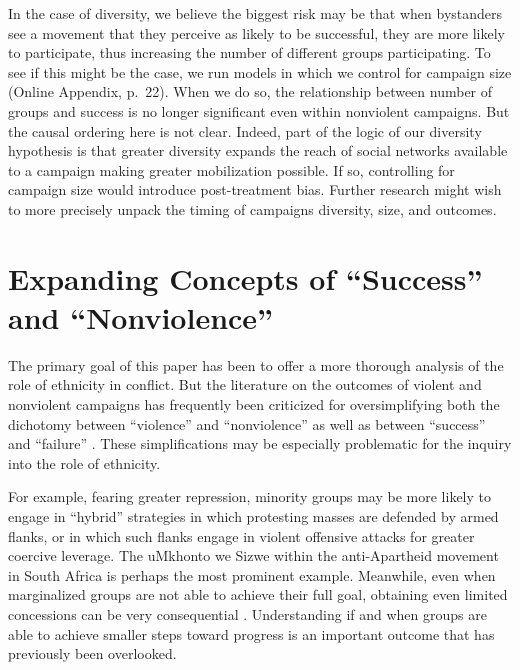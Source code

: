 \documentclass[
  letterpaper,
  DIV=11,
  numbers=noendperiod]{scrartcl}
\begin{document}
In the case of diversity, we believe the biggest risk may be that when
bystanders see a movement that they perceive as likely to be successful,
they are more likely to participate, thus increasing the number of
different groups participating. To see if this might be the case, we run
models in which we control for campaign size (Online Appendix, p.~22).
When we do so, the relationship between number of groups and success is
no longer significant even within nonviolent campaigns. But the causal
ordering here is not clear. Indeed, part of the logic of our diversity
hypothesis is that greater diversity expands the reach of social
networks available to a campaign making greater mobilization possible.
If so, controlling for campaign size would introduce post-treatment
bias. Further research might wish to more precisely unpack the timing of
campaigns diversity, size, and outcomes.

\section{Expanding Concepts of ``Success'' and
``Nonviolence''}\label{expanding-concepts-of-success-and-nonviolence}

The primary goal of this paper has been to offer a more thorough
analysis of the role of ethnicity in conflict. But the literature on the
outcomes of violent and nonviolent campaigns has frequently been
criticized for oversimplifying both the dichotomy between ``violence''
and ``nonviolence'' as well as between ``success'' and ``failure''
\autocite{Turner2023}. These simplifications may be especially
problematic for the inquiry into the role of ethnicity.

For example, fearing greater repression, minority groups may be more
likely to engage in ``hybrid'' strategies in which protesting masses are
defended by armed flanks, or in which such flanks engage in violent
offensive attacks for greater coercive leverage. The uMkhonto we Sizwe
within the anti-Apartheid movement in South Africa is perhaps the most
prominent example. Meanwhile, even when marginalized groups are not able
to achieve their full goal, obtaining even limited concessions can be
very consequential \autocite{Cunningham2023}. Understanding if and when
groups are able to achieve smaller steps toward progress is an important
outcome that has previously been overlooked.
\end{document}
